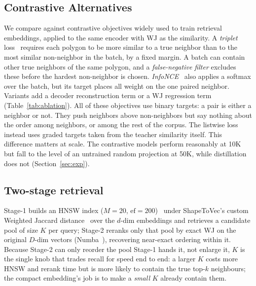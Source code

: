\documentclass[conference]{IEEEtran}
\begin{document}
\subsection{Contrastive Alternatives}
\label{sec:contrastive}
We compare against contrastive objectives widely used to train retrieval embeddings,
applied to the same encoder with WJ as the similarity. A \emph{triplet}
loss~\cite{schroff15} requires each polygon to be more similar to a true neighbor
than to the most similar non-neighbor in the batch, by a fixed margin. A batch can
contain other true neighbors of the same polygon, and a \emph{false-negative filter}
excludes these before the hardest non-neighbor is chosen. \emph{InfoNCE}~\cite{oord18}
also applies a softmax over the batch, but its target places all weight on the one
paired neighbor. Variants add a decoder reconstruction term or a WJ regression term
(Table~\ref{tab:ablation}). All of these objectives use binary targets: a pair is
either a neighbor or not. They push neighbors above non-neighbors but say nothing
about the order among neighbors, or among the rest of the corpus. The listwise loss
instead uses graded targets taken from the teacher similarity itself. This
difference matters at scale. The contrastive models perform reasonably at 10K but fall
to the level of an untrained random projection at 50K, while distillation does not
(Section~\ref{sec:exp}).

\subsection{Two-stage retrieval}
\label{sec:twostage}
Stage-1 builds an HNSW index ($M{=}20$, $\mathrm{ef}{=}200$)~\cite{hnsw20} under
ShapeToVec's custom Weighted Jaccard distance~\cite{shape2vec} over the $d$-dim
embeddings and retrieves a candidate pool of size $K$ per query; Stage-2 reranks
only that pool by exact WJ on the original $D$-dim vectors (Numba~\cite{lam15}),
recovering near-exact ordering within it. Because Stage-2 can only reorder the pool
Stage-1 hands it, not enlarge it, $K$ is the single knob that trades recall for
speed end to end: a larger $K$ costs more HNSW and rerank time but is more likely to
contain the true top-$k$ neighbours; the compact embedding's job is to make a
\emph{small} $K$ already contain them.
\end{document}
